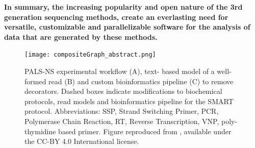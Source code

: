 \documentclass[10pt]{article}
\begin{document}
\textbf{In summary, the increasing popularity and open nature of the 3rd generation sequencing methods, create an everlasting need for versatile, customizable and parallelizable software for the analysis of data that are generated by these methods.}
\begin{figure}
\centering  
\texttt{[image: compositeGraph\_abstract.png]}
\caption{PALS-NS experimental workflow (A), text- based model of a well-formed read (B) and custom bioinformatics pipeline (C) to remove decorators. Dashed boxes indicate modifications to biochemical protocols, read models and bioinformatics pipeline for the SMART protocol.
Abbreviations: SSP, Strand Switching Primer, PCR, Polymerase Chain Reaction, RT, Reverse Transcription, VNP, poly-thymidine based primer. Figure reproduced from \cite{mackenzie_make_2022}, available under the CC-BY 4.0 International license.}\label{fig:PALS-NS}
\end{figure}
\end{document}
